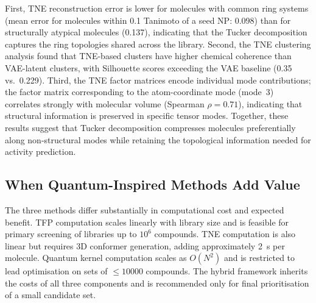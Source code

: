 \documentclass[11pt,a4paper]{article}
\begin{document}
First, TNE reconstruction error is lower for molecules with common ring systems (mean error for molecules within 0.1 Tanimoto of a seed NP: 0.098) than for structurally atypical molecules (0.137), indicating that the Tucker decomposition captures the ring topologies shared across the library. Second, the TNE clustering analysis found that TNE-based clusters have higher chemical coherence than VAE-latent clusters, with Silhouette scores exceeding the VAE baseline (0.35 vs.~0.229). Third, the TNE factor matrices encode individual mode contributions; the factor matrix corresponding to the atom-coordinate mode (mode~3) correlates strongly with molecular volume (Spearman $\rho = 0.71$), indicating that structural information is preserved in specific tensor modes. Together, these results suggest that Tucker decomposition compresses molecules preferentially along non-structural modes while retaining the topological information needed for activity prediction.

\subsection{When Quantum-Inspired Methods Add Value}

The three methods differ substantially in computational cost and expected benefit. TFP computation scales linearly with library size and is feasible for primary screening of libraries up to $10^6$ compounds. TNE computation is also linear but requires 3D conformer generation, adding approximately \SI{2}{\second} per molecule. Quantum kernel computation scales as $O(N^2)$ and is restricted to lead optimisation on sets of $\leq \num{10000}$ compounds. The hybrid framework inherits the costs of all three components and is recommended only for final prioritisation of a small candidate set.
\end{document}
